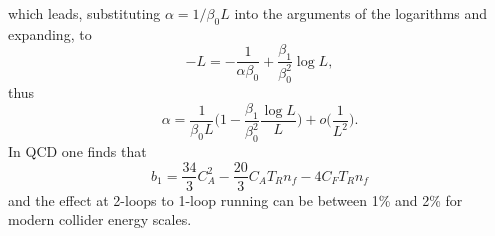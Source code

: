 which leads, substituting $\alpha = 1/\beta_0 L$ into the arguments of the logarithms and expanding, to 
\begin{equation}
    -L = -\frac{1}{\alpha\beta_0} + \frac{\beta_1}{\beta_0^2}\log{L},
\end{equation}
thus 
\begin{equation}
    \alpha = \frac{1}{\beta_0L}\bigg(1 - \frac{\beta_1}{\beta_0^2}\frac{\log{L}}{L}\bigg) + o\bigg(\frac{1}{L^2}\bigg).
\end{equation}
In QCD one finds that 
\begin{equation}
    b_1 = \frac{34}{3}C_A^2 - \frac{20}{3}C_AT_Rn_f - 4C_FT_Rn_f
\end{equation}
and the effect at 2-loops to 1-loop running can be between 1\% and 2\% for modern collider energy scales. 

